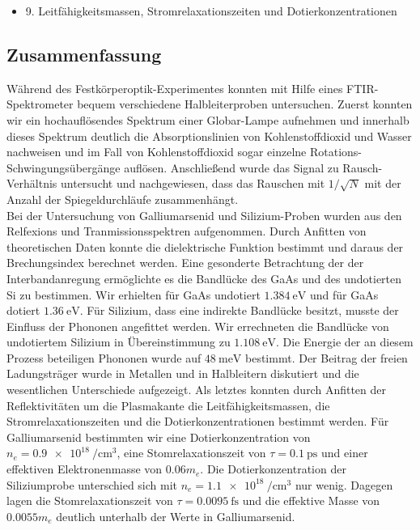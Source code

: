\documentclass[paper=a4,fontsize=10pt,DIV=18,twocolumn,parskip=half]{scrartcl}
\numberwithin{equation}{section}    %
\begin{document}
\begin{itemize}
\item 9. Leitfähigkeitsmassen, Stromrelaxationszeiten und Dotierkonzentrationen
\end{itemize}

\subsection{Zusammenfassung}

Während des Festkörperoptik-Experimentes konnten mit Hilfe eines FTIR-Spektrometer bequem verschiedene Halbleiterproben untersuchen. Zuerst konnten wir ein hochauflösendes Spektrum einer Globar-Lampe aufnehmen und innerhalb dieses Spektrum deutlich die Absorptionslinien von Kohlenstoffdioxid und Wasser nachweisen und im Fall von Kohlenstoffdioxid sogar einzelne Rotations-Schwingungsübergänge auflösen.
Anschließend wurde das Signal zu Rausch-Verhältnis untersucht und nachgewiesen, dass das Rauschen mit $1/\sqrt{N}$ mit der Anzahl der Spiegeldurchläufe zusammenhängt.\\
Bei der Untersuchung von Galliumarsenid und Silizium-Proben wurden aus den Relfexions und Tranmissionsspektren aufgenommen. Durch Anfitten von theoretischen Daten konnte die dielektrische Funktion bestimmt und daraus der Brechungsindex berechnet werden.
Eine gesonderte Betrachtung der der Interbandanregung ermöglichte es die Bandlücke des  GaAs und des undotierten Si zu bestimmen. Wir erhielten für GaAs undotiert $\SI{1.384}{\eV}$ und für GaAs dotiert $\SI{1.36}{\eV}$. Für Silizium, dass eine indirekte Bandlücke besitzt, musste der Einfluss der Phononen angefittet werden. Wir errechneten die Bandlücke von undotiertem Silizium in Übereinstimmung zu $\SI{1.108}{\eV}$. Die Energie der an diesem Prozess beteiligen Phononen wurde auf $\SI{48}{\milli\eV}$ bestimmt. Der Beitrag der freien Ladungsträger wurde in Metallen und in Halbleitern diskutiert und die wesentlichen Unterschiede aufgezeigt. Als letztes konnten durch Anfitten der Reflektivitäten um die Plasmakante die Leitfähigkeitsmassen, die Stromrelaxationszeiten und die Dotierkonzentrationen bestimmt werden. Für Galliumarsenid bestimmten wir eine Dotierkonzentration von $n_e=\SI{0.9e18}{\per\centi\meter^3}$, eine Stomrelaxationszeit von $\tau=\SI{0.1}{\pico\second}$ und einer effektiven Elektronenmasse von $0.06m_e$. Die Dotierkonzentration der Siliziumprobe unterschied sich mit $n_e=\SI{1.1e18}{\per\centi\meter^3}$ nur wenig. Dagegen lagen die Stomrelaxationszeit von $\tau=\SI{0.0095}{\femto\second}$ und die effektive Masse von $0.0055m_e$ deutlich unterhalb der Werte in Galliumarsenid.\\
\end{document}
